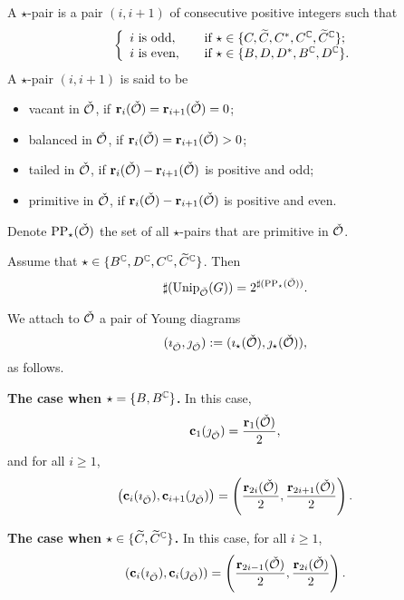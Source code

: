 \documentclass[counting_main.tex]{subfiles}
\begin{document}
\begin{defn}
 A $\star$-pair is a pair  $(i,i+1)$ of consecutive positive integers such that
\[
   \left\{
     \begin{array}{ll}
      i\textrm{ is odd}, \quad &\textrm{if $\star\in\{C, \widetilde{C}, C^*, C^{\mathbb{C}}, \widetilde C^{\mathbb{C}}\}$};  \\
      i \textrm{ is even}, \quad &\textrm{if $\star\in\{B, D, D^*, B^{\mathbb{C}}, D^{\mathbb{C}}\}$}. \\
       \end{array}
   \right.
\]
A $\star$-pair   $(i,i+1)$ is said to be
\begin{itemize}
\item
vacant in $\check {{\mathcal {O}}}$, if $\mathbf r_i(\check {{\mathcal {O}}})=\mathbf r_{i+1}(\check {{\mathcal {O}}})=0$;
\item
balanced in $\check {{\mathcal {O}}}$,  if  $\mathbf r_i(\check {{\mathcal {O}}})=\mathbf r_{i+1}(\check {{\mathcal {O}}})>0$;
\item
tailed in $\check {{\mathcal {O}}}$,  if  $\mathbf r_i(\check {{\mathcal {O}}})-\mathbf r_{i+1}(\check {{\mathcal {O}}})$ is positive and odd;
\item
primitive in $\check {{\mathcal {O}}}$, if    $\mathbf r_i(\check {{\mathcal {O}}})-\mathbf r_{i+1}(\check {{\mathcal {O}}})$ is positive and even.
\end{itemize}
Denote $\mathrm{PP}_\star(\check {{\mathcal {O}}})$ the  set of all $\star$-pairs that are primitive in $\check {{\mathcal {O}}}$.
\end{defn}



\begin{thm}\label{complex}
Assume that $\star\in \{B^{\mathbb{C}},D^{\mathbb{C}}, C^{\mathbb{C}}, \widetilde C^{\mathbb{C}}\}$. Then
 \[
\sharp(\mathrm{Unip}_{\check {{\mathcal {O}}}}(G))=2^{\sharp(\mathrm{PP}_\star(\check {{\mathcal {O}}}))} .        \]
\end{thm}



We attach to $\check {{\mathcal {O}}}$ a pair of Young diagrams
\[
(\imath_{\check {{\mathcal {O}}}}, \jmath_{\check {{\mathcal {O}}}}):=(\imath_\star(\check {{\mathcal {O}}}), \jmath_\star(\check {{\mathcal {O}}})),
\]
 as follows.

\medskip

\noindent
{\bf The case when $\star=\{B, B^{\mathbb{C}}\}$.} In this case,
 \[
   \mathbf c_{1}(\jmath_{\check {{\mathcal {O}}}})=\frac{\mathbf r_1(\check {{\mathcal {O}}})}{2},
\]
and for all $i\geq 1$,
\[
\left (\mathbf c_{i}(\imath_{\check {{\mathcal {O}}}}), \mathbf c_{i+1}(\jmath_{\check {{\mathcal {O}}}})\right )=
            \left (\frac{\mathbf r_{2i}(\check {{\mathcal {O}}})}{2},  \frac{\mathbf r_{2i+1}(\check {{\mathcal {O}}})}{2}\right ).
\]

\medskip

\noindent
{\bf The case when $\star\in \{\widetilde C, \widetilde C^{\mathbb{C}}\}$.}  In this case, for all $i\geq 1$,
\[
(\mathbf c_{i}(\imath_{\check {{\mathcal {O}}}}), \mathbf c_{i}(\jmath_{\check {{\mathcal {O}}}}))=
           \left (\frac{\mathbf r_{2i-1}(\check {{\mathcal {O}}})}{2},  \frac{\mathbf r_{2i}(\check {{\mathcal {O}}})}{2}\right).
\]
\end{document}
